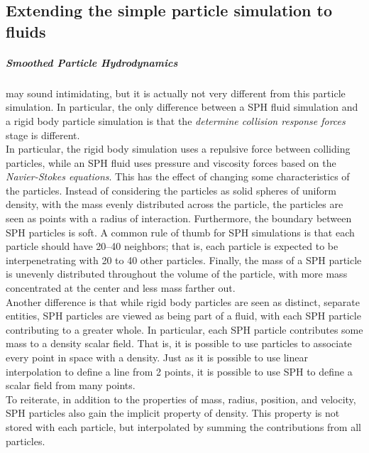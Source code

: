 \documentclass[]{article}
\begin{document}
	\subsection{Extending the simple particle simulation to fluids}
	\subparagraph{\textit{Smoothed Particle Hydrodynamics}} may sound intimidating, but it is actually not very different from 
	this particle simulation. In particular, the only difference between a SPH fluid simulation and a rigid body particle 
	simulation is that the \textit{determine collision response forces} stage is different.\\
	
	In particular, the rigid body simulation uses a repulsive force between colliding particles, while an SPH fluid uses
	pressure and viscosity forces based on the \textit{Navier-Stokes equations}. This has the effect of changing some 
	characteristics of the particles. Instead of considering the particles as solid spheres of uniform density, with the
	mass evenly distributed across the particle, the particles are seen as points with a radius of interaction. 
	Furthermore, the boundary between SPH particles is soft. A common rule of thumb for SPH simulations is that each 
	particle should have 20--40 neighbors; that is, each particle is expected to be interpenetrating with 20 to 40 other
	particles. Finally, the mass of a SPH particle is unevenly distributed throughout the volume of the particle, with
	more mass concentrated at the center and less mass farther out.\\
	
	Another difference is that while rigid body particles are seen as distinct, separate entities, SPH particles are 
	viewed as being part of a fluid, with each SPH particle contributing to a greater whole. In particular, each SPH 
	particle contributes some mass to a density scalar field. That is, it is possible to use particles to associate 
	every point in space with a density. Just as it is possible to use linear interpolation to define a line from 2 
	points, it is possible to use SPH to define a scalar field from many points.\\
	
	To reiterate, in addition to the properties of mass, radius, position, and velocity, SPH particles also gain the 
	implicit property of density. This property is not stored with each particle, but interpolated by summing the 
	contributions from all particles.\\
	
\end{document}
